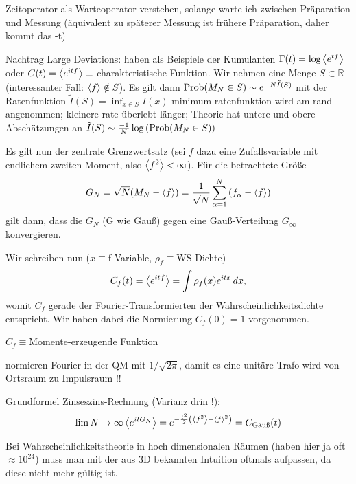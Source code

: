 \documentclass[../KlassMech_main.tex]{subfiles}
\begin{document}
Zeitoperator als Warteoperator verstehen, solange warte ich zwischen Präparation und Messung (äquivalent zu späterer Messung ist frühere Präparation, daher kommt das -t)



Nachtrag Large Deviations: haben als Beispiele der Kumulanten $\Gamma(t) = \log\expval{e^{tf}}$ oder $C(t) = \expval{e^{itf}} \equiv$ charakteristische Funktion. Wir nehmen eine Menge $S \subset \mathbb{R}$ (interessanter Fall: $\expval{f} \notin S$). Es gilt dann $\text{Prob}\qty(M_N \in S) \sim e^{-N \tilde{I}(S)}$ mit der Ratenfunktion $\tilde{I}(S) = \inf_{x \in S} I(x)$
minimum ratenfunktion wird am rand angenommen; kleinere rate überlebt länger; Theorie hat untere und obere Abschätzungen an $\tilde{I}(S) \sim \frac{-1}{N} \log\qty(\text{Prob}\qty(M_N \in S))$

Es gilt nun der zentrale Grenzwertsatz (sei $f$ dazu eine Zufallsvariable mit endlichem zweiten Moment, also $\expval{f^2} < \infty$). Für die betrachtete Größe
\begin{equation}\label{key}
G_N = \sqrt{N} \qty(M_N - \expval{f}) = \frac{1}{\sqrt{N}} \sum\limits_{\alpha = 1}^N \qty(f_\alpha - \expval{f})
\end{equation}
gilt dann, dass die $G_N$ (G wie Gauß) gegen eine Gauß-Verteilung $G_\infty$ konvergieren.

Wir schreiben nun ($x \equiv$f-Variable, $\rho_f \equiv$WS-Dichte)
\begin{equation}\label{key}
C_f(t) = \expval{e^{itf}} = \int \rho_f(x) e^{itx} \, dx ,
\end{equation}
womit $C_f$ gerade der Fourier-Transformierten der Wahrscheinlichkeitsdichte entspricht. Wir haben dabei die Normierung $C_f(0) = 1$ vorgenommen.

$C_f \equiv$Momente-erzeugende Funktion

normieren Fourier in der QM mit $1/\sqrt{2\pi}$, damit es eine unitäre Trafo wird von Ortsraum zu Impulsraum !!

Grundformel Zinseszins-Rechnung (Varianz drin !):
\begin{equation}\label{key}
\lim{N \rightarrow \infty} \expval{e^{it G_N}} = e^{-\frac{t^2}{2} \qty(\expval{f^2} - \expval{f}^2)} = C_{\text{Gauß}}(t)
\end{equation}

Bei Wahrscheinlichkeitstheorie in hoch dimensionalen Räumen (haben hier ja oft $\approx 10^{24}$) muss man mit der aus 3D bekannten Intuition oftmals aufpassen, da diese nicht mehr gültig ist.
\end{document}
